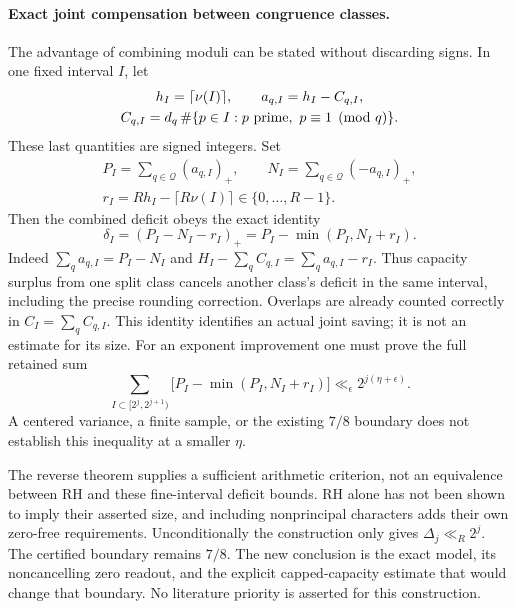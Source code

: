 \documentclass[11pt]{article}
\theoremstyle{definition}
\begin{document}
\paragraph{Exact joint compensation between congruence classes.}
The advantage of combining moduli can be stated without discarding
signs. In one fixed interval $I$, let
\[
 \begin{gathered}
 h_I=\lceil\nu(I)\rceil,\qquad a_{q,I}=h_I-C_{q,I},\\
 C_{q,I}=d_q\,\#\{p\in I:p\ {\rm prime},\ p\equiv1\pmod q\}.
 \end{gathered}
\]
These last quantities are signed integers. Set
\[
 \begin{gathered}
 P_I=\sum_{q\in\mathcal Q}(a_{q,I})_+,\qquad
 N_I=\sum_{q\in\mathcal Q}(-a_{q,I})_+,\\
 r_I=R h_I-\lceil R\nu(I)\rceil\in\{0,\ldots,R-1\}.
 \end{gathered}
\]
Then the combined deficit obeys the exact identity
\begin{equation}
 \delta_I=(P_I-N_I-r_I)_+
         =P_I-\min(P_I,N_I+r_I).
 \label{eq:exact-joint-capacity-compensation}
\end{equation}
Indeed $\sum_q a_{q,I}=P_I-N_I$ and
$H_I-\sum_q C_{q,I}=\sum_q a_{q,I}-r_I$.
Thus capacity surplus from one split class cancels another
class's deficit in the same interval, including the precise
rounding correction. Overlaps are already counted correctly
in $C_I=\sum_q C_{q,I}$. This identity identifies an actual
joint saving; it is not an estimate for its size.
For an exponent improvement one must prove the full retained sum
\begin{equation}
 \sum_{I\subset[2^j,2^{j+1})}
       \bigl[P_I-\min(P_I,N_I+r_I)\bigr]
       \ll_\epsilon 2^{j(\eta+\epsilon)}.
 \label{eq:joint-capacity-analytic-target}
\end{equation}
A centered variance, a finite sample, or the existing $7/8$
boundary does not establish this inequality at a smaller $\eta$.

The reverse theorem supplies a sufficient arithmetic criterion,
not an equivalence between RH and these fine-interval deficit
bounds. RH alone has not been shown to imply their asserted
size, and including nonprincipal characters adds their own
zero-free requirements. Unconditionally the construction only
gives $\Delta_j\ll_R2^j$. The certified boundary remains $7/8$.
The new conclusion is the exact model, its noncancelling
zero readout, and the explicit capped-capacity estimate that
would change that boundary. No literature priority is asserted
for this construction.
\end{document}
